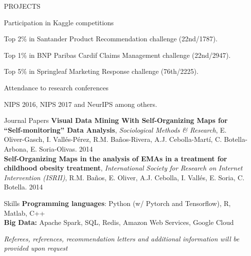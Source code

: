 \documentclass{resume} %
\begin{document}
\begin{rSection}{PROJECTS}
\vspace{-6pt}

\begin{rSubsection}{Participation in Kaggle competitions}
{}{}{}  

\vspace{-3pt}

\item Top 2\% in Santander Product Recommendation challenge (22nd/1787).
\item Top 1\% in BNP Paribas Cardif Claims Management challenge (22nd/2947).
\item Top 5\% in Springleaf Marketing Response challenge (76th/2225).

\end{rSubsection}

\vspace{-6pt}

\begin{rSubsection}{Attendance to research conferences}{}{}{}  

\vspace{-3pt}

 \item NIPS 2016, NIPS 2017 and NeurIPS  among others.

\end{rSubsection}

\end{rSection} 


\begin{rSection}{Journal Papers}
{\textbf{Visual Data Mining With Self-Organizing Maps for ``Self-monitoring'' Data Analysis}, \textit{Sociological Methods \& Research}, E. Oliver-Gasch, I. Vallés-Pérez, R.M. Baños-Rivera, A.J. Cebolla-Martí, C. Botella-Arbona, E. Soria-Olivas. \hfill {2014}}\\
{\textbf{Self-Organizing Maps in the analysis of EMAs in a treatment for childhood obesity treatment}, \textit{International Society for Research on Internet Intervention (ISRII)}, R.M. Baños, E. Oliver, A.J. Cebolla, I. Vallés, E. Soria, C. Botella.  \hfill {2014}}

\end{rSection}




\begin{rSection}{Skills} \itemsep -3pt  
{\textbf{Programming languages}: Python (w/ Pytorch and Tensorflow), R, Matlab, C++ }  \\
{\textbf{Big Data:} Apache Spark, SQL, Redis, Amazon Web Services, Google Cloud } 
\end{rSection}  
 
\vspace{\fill}

\begin{flushright}
	\small{\textit{Referees, references, recommendation letters and additional information will be provided upon request}}
\end{flushright}
\end{document}
